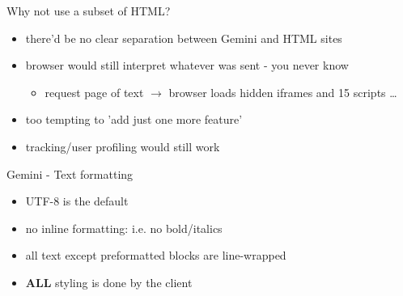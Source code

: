 \documentclass[presentation, 11pt,  aspectratio=169]{beamer}
\renewcommand{\alert}[1]{\textbf{\textcolor{mydarkred}{#1}}}
\begin{document}
\begin{frame}[label={sec:orgce98e5f}]{Why not use a subset of HTML?}
\begin{itemize}
\item there'd be no clear separation between Gemini and HTML sites\\
\item browser would still interpret whatever was sent - you never know\\
\begin{itemize}
\item request page of text \(\rightarrow\) browser loads hidden iframes and 15 scripts \ldots{}\\
\end{itemize}
\item too tempting to 'add just one more feature'\\
\item tracking/user profiling would still work\\
\end{itemize}
\end{frame}


\begin{frame}[label={sec:org688e6a6}]{Gemini - Text formatting}
\begin{itemize}
\item UTF-8 is the default\\
\item no inline formatting: i.e. no bold/italics\\
\item all text except preformatted blocks are line-wrapped\\
\item \alert{ALL} styling is done by the client\\
\end{itemize}
\end{frame}
\end{document}

